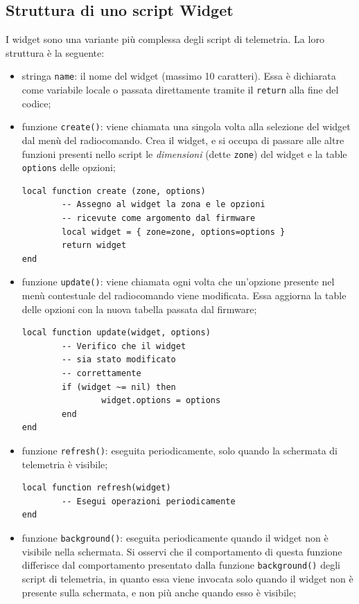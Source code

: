 \documentclass[a4paper, 12pt]{report} %
\begin{document}
\subsection{Struttura di uno script Widget}
I widget sono una variante più complessa degli script di telemetria. La loro struttura è la seguente:
\begin{itemize}
        \item stringa \texttt{name}: il nome del widget (massimo 10 caratteri). Essa è dichiarata come variabile locale o passata direttamente tramite il \texttt{return} alla fine del codice;
        \item funzione \texttt{create()}: viene chiamata una singola volta alla selezione del widget dal menù del radiocomando. Crea il widget, e si occupa di passare alle altre funzioni presenti nello script le \emph{dimensioni} (dette \texttt{zone}) del widget e la table \texttt{options} delle opzioni;
\begin{lstlisting}
local function create (zone, options)
        -- Assegno al widget la zona e le opzioni
        -- ricevute come argomento dal firmware
        local widget = { zone=zone, options=options }
        return widget
end
\end{lstlisting}
        \item funzione \texttt{update()}: viene chiamata ogni volta che un'opzione presente nel menù contestuale del radiocomando viene modificata. Essa aggiorna la table delle opzioni con la nuova tabella passata dal firmware;
\begin{lstlisting}
local function update(widget, options)
        -- Verifico che il widget
        -- sia stato modificato
        -- correttamente
        if (widget ~= nil) then
                widget.options = options
        end
end
\end{lstlisting}
        \item funzione \texttt{refresh()}: eseguita periodicamente, solo quando la schermata di telemetria è visibile;
\begin{lstlisting}
local function refresh(widget)
        -- Esegui operazioni periodicamente
end
\end{lstlisting}
        \item funzione \texttt{background()}: eseguita periodicamente quando il widget non è visibile nella schermata. Si osservi che il comportamento di questa funzione differisce dal comportamento presentato dalla funzione \texttt{background()} degli script di telemetria, in quanto essa viene invocata solo quando il widget non è presente sulla schermata, e non più anche quando esso è visibile;

\end{itemize}
\end{document}
